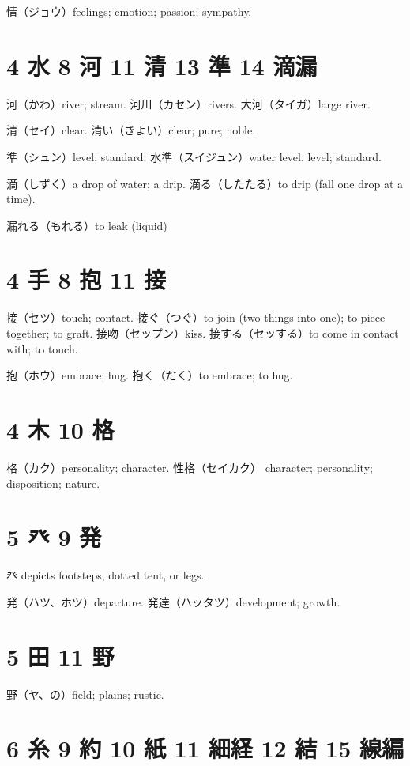 情（ジョウ）feelings; emotion; passion; sympathy.

\section{4 水 8 河 11 清 13 準 14 滴漏}

河（かわ）river; stream.
河川（カセン）rivers.
大河（タイガ）large river.

清（セイ）clear.
清い（きよい）clear; pure; noble.

準（シュン）level; standard.
水準（スイジュン）water level. level; standard.

滴（しずく）a drop of water; a drip.
滴る（したたる）to drip (fall one drop at a time).

漏れる（もれる）to leak (liquid)

\section{4 手 8 抱 11 接}

接（セツ）touch; contact.
接ぐ（つぐ）to join (two things into one); to piece together; to graft.
接吻（セップン）kiss.
接する（セッする）to come in contact with; to touch.

抱（ホウ）embrace; hug.
抱く（だく）to embrace; to hug.

\section{4 木 10 格}

格（カク）personality; character.
性格（セイカク）
character; personality; disposition; nature.

\section{5 癶 9 発}

癶 depicts footsteps, dotted tent, or legs.

発（ハツ、ホツ）departure.
発達（ハッタツ）development; growth.

\section{5 田 11 野}

野（ヤ、の）field; plains; rustic.

\section{6 糸 9 約 10 紙 11 細経 12 結 15 線編}

